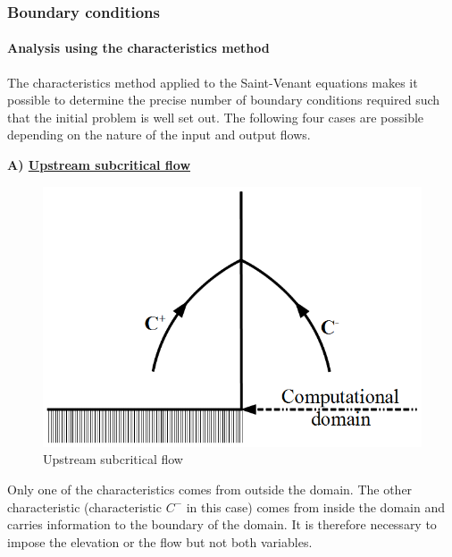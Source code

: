 \subsubsection{Boundary conditions}

\label{PriseCL}

\paragraph{Analysis using the characteristics method\\}

\hspace*{1cm}

The characteristics method applied to the Saint-Venant equations makes it possible to determine the precise number of boundary conditions required such that the initial problem is well set out. The following four cases are possible depending on the nature of the input and output flows.

\vspace{0.5cm}

\textbf{A) \underline{Upstream subcritical flow}}

\vspace{0.5cm}

\begin{figure}[h]
 \begin{center}
  \includegraphics[scale=1.]{Figures/AmontFluvial.eps}
  \caption{Upstream subcritical flow}
 \end{center}
\end{figure}

Only one of the characteristics comes from outside the domain. The other characteristic (characteristic $C^-$ in this case) comes from inside the domain and carries information to the boundary of the domain. It is therefore necessary to impose the elevation or the flow but not both variables.

